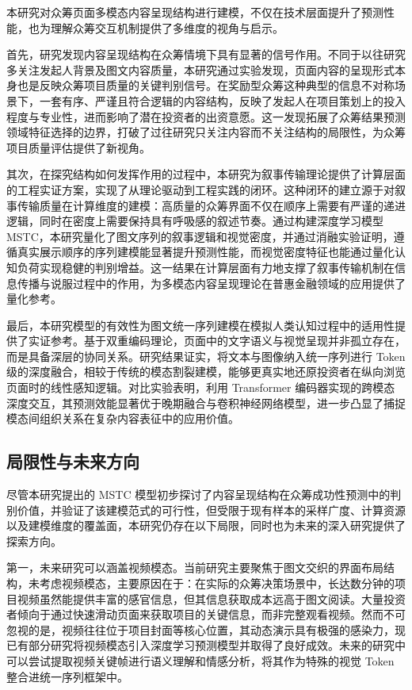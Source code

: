 本研究对众筹页面多模态内容呈现结构进行建模，不仅在技术层面提升了预测性能，也为理解众筹交互机制提供了多维度的视角与启示。

首先，研究发现内容呈现结构在众筹情境下具有显著的信号作用。不同于以往研究多关注发起人背景及图文内容质量，本研究通过实验发现，页面内容的呈现形式本身也是反映众筹项目质量的关键判别信号。在奖励型众筹这种典型的信息不对称场景下，一套有序、严谨且符合逻辑的内容结构，反映了发起人在项目策划上的投入程度与专业性，进而影响了潜在投资者的出资意愿。这一发现拓展了众筹结果预测领域特征选择的边界，打破了过往研究只关注内容而不关注结构的局限性，为众筹项目质量评估提供了新视角。

其次，在探究结构如何发挥作用的过程中，本研究为叙事传输理论提供了计算层面的工程实证方案，实现了从理论驱动到工程实践的闭环。这种闭环的建立源于对叙事传输质量在计算维度的建模：高质量的众筹界面不仅在顺序上需要有严谨的递进逻辑，同时在密度上需要保持具有呼吸感的叙述节奏。通过构建深度学习模型 MSTC，本研究量化了图文序列的叙事逻辑和视觉密度，并通过消融实验证明，遵循真实展示顺序的序列建模能显著提升预测性能，而视觉密度特征也能通过量化认知负荷实现稳健的判别增益。这一结果在计算层面有力地支撑了叙事传输机制在信息传播与说服过程中的作用，为多模态内容呈现理论在普惠金融领域的应用提供了量化参考。

最后，本研究模型的有效性为图文统一序列建模在模拟人类认知过程中的适用性提供了实证参考。基于双重编码理论，页面中的文字语义与视觉呈现并非孤立存在，而是具备深层的协同关系。研究结果证实，将文本与图像纳入统一序列进行 Token 级的深度融合，相较于传统的模态割裂建模，能够更真实地还原投资者在纵向浏览页面时的线性感知逻辑。对比实验表明，利用 Transformer 编码器实现的跨模态深度交互，其预测效能显著优于晚期融合与卷积神经网络模型，进一步凸显了捕捉模态间组织关系在复杂内容表征中的应用价值。

\subsection{局限性与未来方向}

尽管本研究提出的 MSTC 模型初步探讨了内容呈现结构在众筹成功性预测中的判别价值，并验证了该建模范式的可行性，但受限于现有样本的采样广度、计算资源以及建模维度的覆盖面，本研究仍存在以下局限，同时也为未来的深入研究提供了探索方向。

第一，未来研究可以涵盖视频模态。当前研究主要聚焦于图文交织的界面布局结构，未考虑视频模态，主要原因在于：在实际的众筹决策场景中，长达数分钟的项目视频虽然能提供丰富的感官信息，但其信息获取成本远高于图文阅读。大量投资者倾向于通过快速滑动页面来获取项目的关键信息，而非完整观看视频。然而不可忽视的是，视频往往位于项目封面等核心位置，其动态演示具有极强的感染力，现已有部分研究将视频模态引入深度学习预测模型并取得了良好成效。未来的研究中可以尝试提取视频关键帧进行语义理解和情感分析，将其作为特殊的视觉 Token 整合进统一序列框架中。

